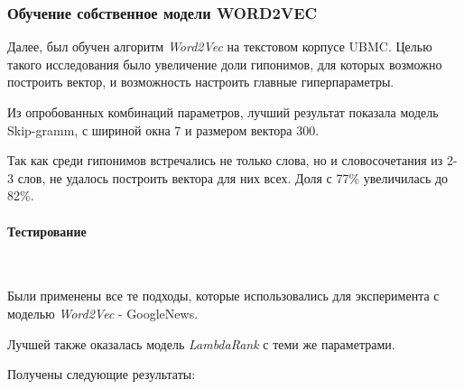 \subsubsection{Обучение собственное модели WORD2VEC}

Далее, был обучен алгоритм \textit{Word2Vec} на текстовом корпусе UBMC. Целью такого
исследования было увеличение доли гипонимов, для которых возможно построить вектор,
и возможность настроить главные гиперпараметры.

Из опробованных комбинаций параметров, лучший результат показала модель Skip-gramm,
с шириной окна 7 и размером вектора 300.

Так как среди гипонимов встречались не только слова, но и словосочетания из 2-3 слов, не
удалось построить вектора для них всех. Доля с 77\% увеличилась до 82\%.

\paragraph{Тестирование}
~\
~\

Были применены все те подходы, которые использовались для эксперимента с моделью
\textit{Word2Vec} - GoogleNews.

Лучшей также оказалась модель \textit{LambdaRank} с теми же параметрами.

Получены следующие результаты:

